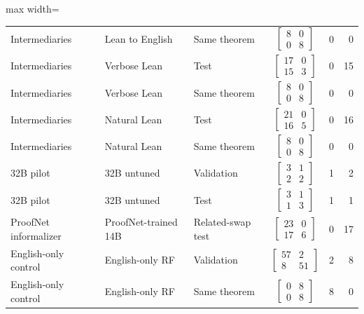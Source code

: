 \begin{table}[htbp]
\begin{adjustbox}{max width=\textwidth}
\begin{tabular}{lllcrr}
Intermediaries & Lean to English & Same theorem & $\left[\begin{smallmatrix}8&0\\0&8\end{smallmatrix}\right]$ & 0 & 0 \\
Intermediaries & Verbose Lean & Test & $\left[\begin{smallmatrix}17&0\\15&3\end{smallmatrix}\right]$ & 0 & 15 \\
Intermediaries & Verbose Lean & Same theorem & $\left[\begin{smallmatrix}8&0\\0&8\end{smallmatrix}\right]$ & 0 & 0 \\
Intermediaries & Natural Lean & Test & $\left[\begin{smallmatrix}21&0\\16&5\end{smallmatrix}\right]$ & 0 & 16 \\
Intermediaries & Natural Lean & Same theorem & $\left[\begin{smallmatrix}8&0\\0&8\end{smallmatrix}\right]$ & 0 & 0 \\
32B pilot & 32B untuned & Validation & $\left[\begin{smallmatrix}3&1\\2&2\end{smallmatrix}\right]$ & 1 & 2 \\
32B pilot & 32B untuned & Test & $\left[\begin{smallmatrix}3&1\\1&3\end{smallmatrix}\right]$ & 1 & 1 \\
ProofNet informalizer & ProofNet-trained 14B & Related-swap test & $\left[\begin{smallmatrix}23&0\\17&6\end{smallmatrix}\right]$ & 0 & 17 \\
English-only control & English-only RF & Validation & $\left[\begin{smallmatrix}57&2\\8&51\end{smallmatrix}\right]$ & 2 & 8 \\
English-only control & English-only RF & Same theorem & $\left[\begin{smallmatrix}0&8\\0&8\end{smallmatrix}\right]$ & 8 & 0 \\

\end{tabular}
\end{adjustbox}
\end{table}
